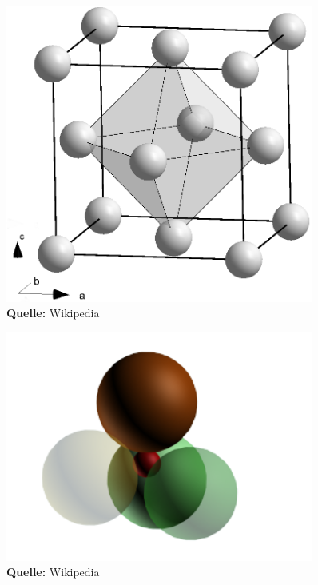 \documentclass[a4paper,titlepage]{scrartcl}
\numberwithin{equation}{section}
\begin{document}
\begin{figure}[H]
\centering
\begin{minipage}{.4\textwidth}
	\centering
  	\includegraphics[width=0.9\textwidth]{oktaeder.png}\\
	\footnotesize\sffamily\textbf{Quelle:} Wikipedia \cite{wiki:oktaederluecke}
    \captionsetup{width=\textwidth}
    \label{fig:oktaeder}
\end{minipage}%
\begin{minipage}{.4\textwidth}
	\centering
	\includegraphics[width=0.9\textwidth]{tetraeder.png}\\
	\footnotesize\sffamily\textbf{Quelle:} Wikipedia \cite{wiki:tetraederluecke}
	\captionsetup{width=\textwidth}
	\label{fig:tetraeder}
\end{minipage}
\end{figure}
\end{document}
